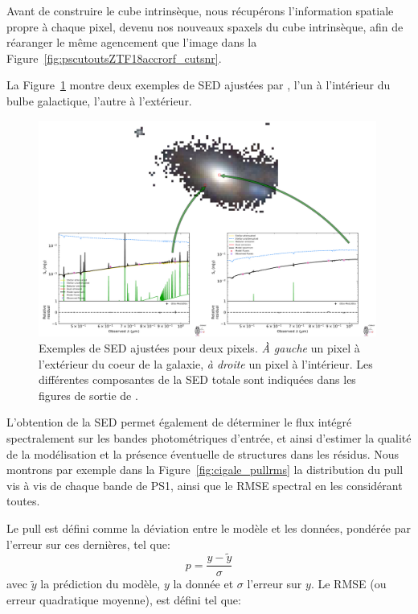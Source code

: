 \documentclass[../main/main.tex]{subfiles}
\begin{document}
Avant de construire le cube intrinsèque, nous récupérons l'information
spatiale propre à chaque pixel, devenu nos nouveaux spaxels du cube intrinsèque, afin de
réaranger le même agencement que l'image dans la
Figure~\ref{fig:pscutoutsZTF18accrorf_cutsnr}.

La Figure~\ref{fig:cigalesinglespectra} montre deux exemples de SED
ajustées par \cigale, l'un à l'intérieur du bulbe galactique, l'autre à l'extérieur.

\begin{figure}[ht]
  \centering
  \includegraphics[width=0.99\textwidth]{../figures/05_sedfit/cigalesinglespectra2.pdf}
  \caption[Exemples de SED fittés]{Exemples de SED ajustées pour deux
    pixels. \textit{À gauche} un pixel à l'extérieur du coeur de la
    galaxie, \textit{à droite} un pixel à l'intérieur. Les différentes
    composantes de la SED totale sont indiquées dans les figures de
    sortie de \cigale.}
  \label{fig:cigalesinglespectra}
\end{figure}

L'obtention de la SED permet également de déterminer le flux intégré spectralement sur
les bandes photométriques d'entrée, et ainsi d'estimer la qualité de
la modélisation et la présence éventuelle de structures dans les résidus. Nous montrons par exemple dans la
Figure~\ref{fig:cigale_pullrms} la distribution du pull vis à vis de
chaque bande de PS1, ainsi que le RMSE spectral en les considérant
toutes.

Le pull est défini comme la déviation entre le modèle et les données,
pondérée par l'erreur sur ces dernières, tel que:
\begin{equation}
  \label{eq:pull}
  p = \frac{y - \widetilde{y}}{\sigma}
\end{equation}
avec $\widetilde{y}$ la prédiction du modèle, $y$ la donnée et $\sigma$
l'erreur sur $y$.
Le RMSE (ou erreur quadratique moyenne), est défini tel que:
\end{document}
